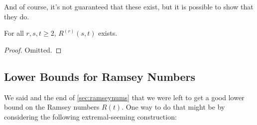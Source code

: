 And of course, it's not guaranteed that these exist, but it is possible to show that they do.

\begin{theorem}
	For all $r, s, t \geq 2$, $R^{(r)}(s, t)$ exists.
\end{theorem}
\begin{proof}
	Omitted.\let\qed\relax
\end{proof}

\subsection{Lower Bounds for Ramsey Numbers}

We said and the end of \autoref{sec:ramseynums} that we were left to get a good lower bound on the Ramsey numbers $R(t)$. One way to do that might be by considering the following extremal-seeming construction:

